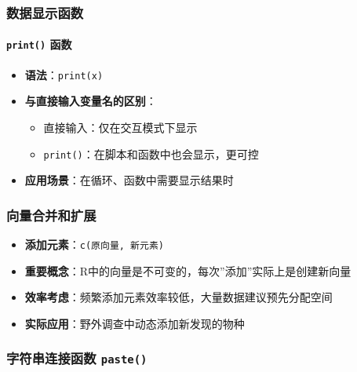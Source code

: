 \documentclass[
  twoside]{book}
\providecommand{\tightlist}{%
  \setlength{\itemsep}{0pt}\setlength{\parskip}{0pt}}
\begin{document}
\hypertarget{ux6570ux636eux663eux793aux51fdux6570}{%
\subsubsection{数据显示函数}\label{ux6570ux636eux663eux793aux51fdux6570}}

\hypertarget{print-ux51fdux6570}{%
\paragraph{\texorpdfstring{\texttt{print()} 函数}{print() 函数}}\label{print-ux51fdux6570}}

\begin{itemize}
\tightlist
\item
  \textbf{语法}：\texttt{print(x)}
\item
  \textbf{与直接输入变量名的区别}：

  \begin{itemize}
  \tightlist
  \item
    直接输入：仅在交互模式下显示
  \item
    \texttt{print()}：在脚本和函数中也会显示，更可控
  \end{itemize}
\item
  \textbf{应用场景}：在循环、函数中需要显示结果时
\end{itemize}

\hypertarget{ux5411ux91cfux5408ux5e76ux548cux6269ux5c55}{%
\subsubsection{向量合并和扩展}\label{ux5411ux91cfux5408ux5e76ux548cux6269ux5c55}}

\begin{itemize}
\tightlist
\item
  \textbf{添加元素}：\texttt{c(原向量,\ 新元素)}
\item
  \textbf{重要概念}：R中的向量是不可变的，每次''添加''实际上是创建新向量
\item
  \textbf{效率考虑}：频繁添加元素效率较低，大量数据建议预先分配空间
\item
  \textbf{实际应用}：野外调查中动态添加新发现的物种
\end{itemize}

\hypertarget{ux5b57ux7b26ux4e32ux8fdeux63a5ux51fdux6570-paste}{%
\subsubsection{\texorpdfstring{字符串连接函数 \texttt{paste()}}{字符串连接函数 paste()}}\label{ux5b57ux7b26ux4e32ux8fdeux63a5ux51fdux6570-paste}}
\end{document}
